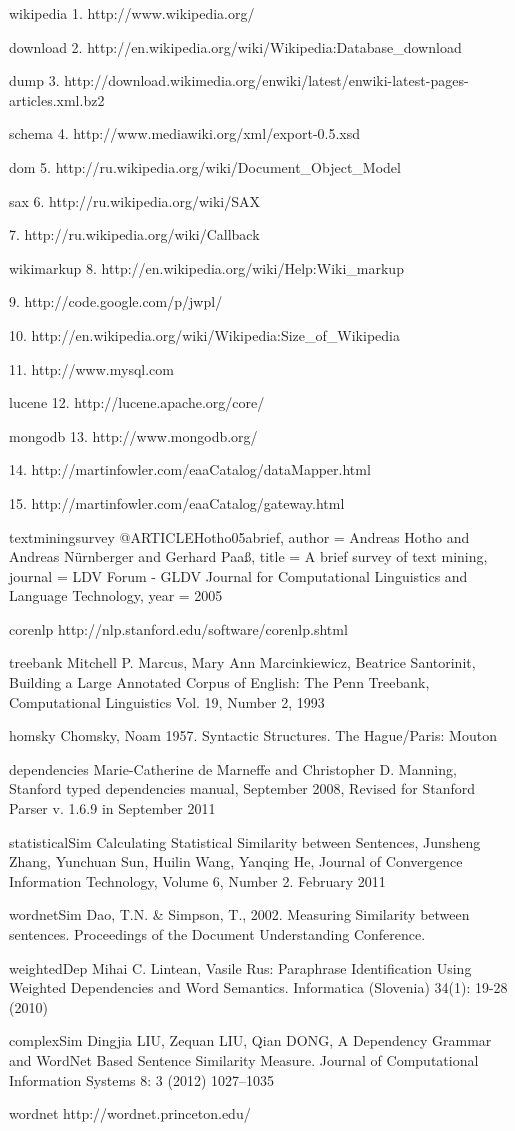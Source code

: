 
wikipedia
1. http://www.wikipedia.org/

download
2. http://en.wikipedia.org/wiki/Wikipedia:Database_download

dump
3. http://download.wikimedia.org/enwiki/latest/enwiki-latest-pages-articles.xml.bz2

schema
4. http://www.mediawiki.org/xml/export-0.5.xsd

dom
5. http://ru.wikipedia.org/wiki/Document_Object_Model

sax
6. http://ru.wikipedia.org/wiki/SAX

7. http://ru.wikipedia.org/wiki/Callback

wikimarkup
8. http://en.wikipedia.org/wiki/Help:Wiki_markup

9. http://code.google.com/p/jwpl/

10. http://en.wikipedia.org/wiki/Wikipedia:Size_of_Wikipedia

11. http://www.mysql.com

lucene
12. http://lucene.apache.org/core/

mongodb
13. http://www.mongodb.org/

14. http://martinfowler.com/eaaCatalog/dataMapper.html

15. http://martinfowler.com/eaaCatalog/gateway.html

textminingsurvey
@ARTICLE{Hotho05abrief,
    author = {Andreas Hotho and Andreas Nürnberger and Gerhard Paaß},
    title = {A brief survey of text mining},
    journal = {LDV Forum - GLDV Journal for Computational Linguistics and Language Technology},
    year = {2005}
}

corenlp
http://nlp.stanford.edu/software/corenlp.shtml

treebank
Mitchell  P. Marcus, Mary Ann Marcinkiewicz, Beatrice Santorinit, Building a Large Annotated Corpus of English: The Penn Treebank, Computational Linguistics Vol. 19, Number 2, 1993

homsky
Chomsky, Noam 1957. Syntactic Structures. The Hague/Paris: Mouton

dependencies
Marie-Catherine de Marneffe and Christopher D. Manning, Stanford typed dependencies manual, September 2008, Revised for Stanford Parser v. 1.6.9 in September 2011

statisticalSim
Calculating Statistical Similarity between Sentences, Junsheng Zhang, Yunchuan Sun, Huilin Wang, Yanqing He, Journal of Convergence Information Technology, Volume 6, Number 2. February 2011

wordnetSim
Dao, T.N. & Simpson, T., 2002. Measuring Similarity between sentences. Proceedings of the Document Understanding Conference. 

weightedDep
Mihai C. Lintean, Vasile Rus: Paraphrase Identification Using Weighted Dependencies and Word Semantics. Informatica (Slovenia) 34(1): 19-28 (2010)

complexSim
Dingjia LIU, Zequan LIU, Qian DONG, A Dependency Grammar and WordNet Based Sentence Similarity Measure. Journal of Computational Information Systems 8: 3 (2012) 1027–1035

wordnet
http://wordnet.princeton.edu/


